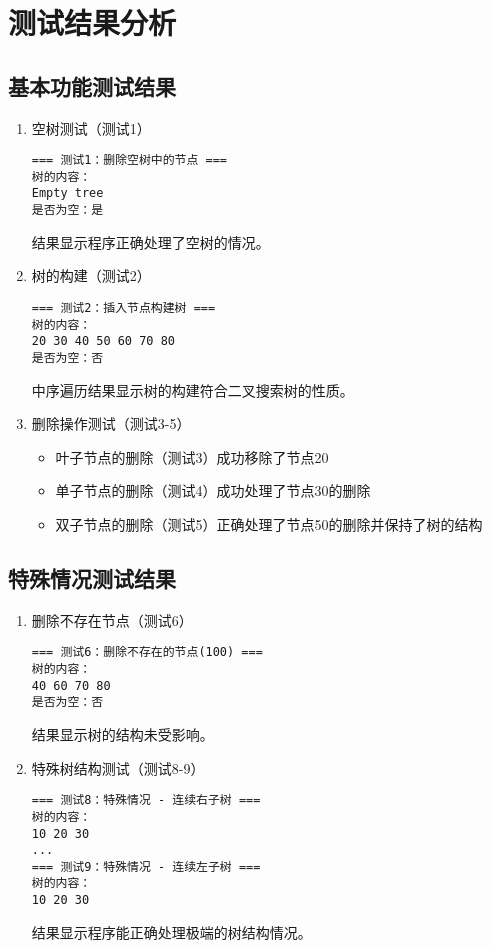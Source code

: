\documentclass[UTF8]{ctexart}
\begin{document}
\section{测试结果分析}

\subsection{基本功能测试结果}

\begin{enumerate}
    \item 空树测试（测试1）
    \begin{lstlisting}
=== 测试1：删除空树中的节点 ===
树的内容：
Empty tree
是否为空：是
    \end{lstlisting}
    结果显示程序正确处理了空树的情况。

    \item 树的构建（测试2）
    \begin{lstlisting}
=== 测试2：插入节点构建树 ===
树的内容：
20 30 40 50 60 70 80
是否为空：否
    \end{lstlisting}
    中序遍历结果显示树的构建符合二叉搜索树的性质。

    \item 删除操作测试（测试3-5）
    \begin{itemize}
        \item 叶子节点的删除（测试3）成功移除了节点20
        \item 单子节点的删除（测试4）成功处理了节点30的删除
        \item 双子节点的删除（测试5）正确处理了节点50的删除并保持了树的结构
    \end{itemize}
\end{enumerate}

\subsection{特殊情况测试结果}

\begin{enumerate}
    \item 删除不存在节点（测试6）
    \begin{lstlisting}
=== 测试6：删除不存在的节点(100) ===
树的内容：
40 60 70 80
是否为空：否
    \end{lstlisting}
    结果显示树的结构未受影响。

    \item 特殊树结构测试（测试8-9）
    \begin{lstlisting}
=== 测试8：特殊情况 - 连续右子树 ===
树的内容：
10 20 30
...
=== 测试9：特殊情况 - 连续左子树 ===
树的内容：
10 20 30
    \end{lstlisting}
    结果显示程序能正确处理极端的树结构情况。
\end{enumerate}
\end{document}
